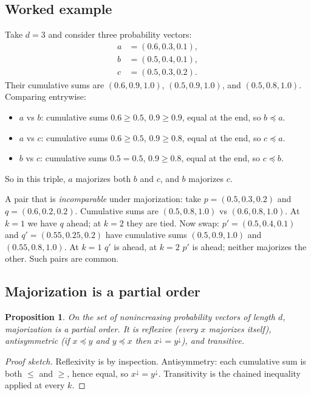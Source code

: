 \documentclass[11pt,a4paper]{article}
\theoremstyle{definition}
\theoremstyle{plain}
\newtheorem{proposition}[definition]{Proposition}
\theoremstyle{remark}
\begin{document}
\subsection{Worked example}

Take $d = 3$ and consider three probability vectors:
\begin{align*}
  a &= (0.6, 0.3, 0.1),\\
  b &= (0.5, 0.4, 0.1),\\
  c &= (0.5, 0.3, 0.2).
\end{align*}
Their cumulative sums are $(0.6, 0.9, 1.0)$, $(0.5, 0.9, 1.0)$, and
$(0.5, 0.8, 1.0)$.  Comparing entrywise:
\begin{itemize}[nosep]
  \item $a$ vs $b$: cumulative sums $0.6 \ge 0.5$, $0.9 \ge 0.9$, equal
        at the end, so $b \preceq a$.
  \item $a$ vs $c$: cumulative sums $0.6 \ge 0.5$, $0.9 \ge 0.8$, equal
        at the end, so $c \preceq a$.
  \item $b$ vs $c$: cumulative sums $0.5 = 0.5$, $0.9 \ge 0.8$, equal
        at the end, so $c \preceq b$.
\end{itemize}
So in this triple, $a$ majorizes both $b$ and $c$, and $b$ majorizes
$c$.

A pair that is \emph{incomparable} under majorization: take
$p = (0.5, 0.3, 0.2)$ and $q = (0.6, 0.2, 0.2)$.  Cumulative sums are
$(0.5, 0.8, 1.0)$ vs $(0.6, 0.8, 1.0)$.  At $k=1$ we have $q$ ahead;
at $k=2$ they are tied.  Now swap: $p' = (0.5, 0.4, 0.1)$ and
$q' = (0.55, 0.25, 0.2)$ have cumulative sums $(0.5, 0.9, 1.0)$ and
$(0.55, 0.8, 1.0)$.  At $k=1$ $q'$ is ahead, at $k=2$ $p'$ is ahead;
neither majorizes the other.  Such pairs are common.

\subsection{Majorization is a partial order}

\begin{proposition}\label{prop:maj-poset}
On the set of nonincreasing probability vectors of length $d$,
majorization is a partial order.  It is reflexive (every $x$
majorizes itself), antisymmetric (if $x \preceq y$ and $y \preceq x$
then $x^\downarrow = y^\downarrow$), and transitive.
\end{proposition}
\begin{proof}[Proof sketch]
Reflexivity is by inspection.  Antisymmetry: each cumulative sum is
both $\le$ and $\ge$, hence equal, so $x^\downarrow = y^\downarrow$.
Transitivity is the chained inequality applied at every $k$.
\end{proof}
\end{document}
